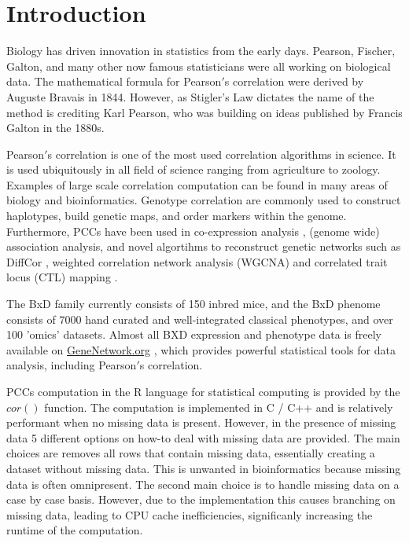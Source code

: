 \documentclass{bioinfo}
\begin{document}
\maketitle

\section{Introduction}
Biology has driven innovation in statistics from the early days. 
Pearson, Fischer, Galton, and many other now famous statisticians 
were all working on biological data. The mathematical formula 
for Pearson$'$s correlation were derived by Auguste Bravais in 1844. 
However, as Stigler's Law \citep{Stigler1980} dictates the name 
of the method is crediting Karl Pearson, who was building on 
ideas published by Francis Galton in the 1880s. 


Pearson$'$s correlation is one of the most used correlation algorithms in science. 
It is used ubiquitously in all field of science ranging from agriculture to 
zoology. Examples of large scale correlation computation can be found in many 
areas of biology and bioinformatics. Genotype correlation are commonly used to 
construct haplotypes, build genetic maps, and order markers within the genome. 
Furthermore, PCCs have been used in co-expression analysis \citep{Tesson:2010}, 
(genome wide) association analysis, and novel algortihms to reconstruct genetic 
networks such as DiffCor \citep{Fukushima:2013}, weighted correlation network 
analysis (WGCNA) \citep{Horvath:2008} and correlated trait locus (CTL) mapping 
\citep{Arends2016a}.

The BxD family currently consists of 150 inbred mice, and the BxD phenome consists 
of 7000 hand curated and well-integrated classical phenotypes, and over 100 'omics' 
datasets. Almost all BXD expression and phenotype data is freely available on 
\href{https://genenetwork.org/}{GeneNetwork.org} \citep{Sloan2016}, which provides 
powerful statistical tools for data analysis, including Pearson$'$s correlation.

PCCs computation in the R language for statistical computing \citep{R:2005} is 
provided by the $cor()$ function. The computation is implemented in C / C++ and 
is relatively performant when no missing data is present. However, 
in the presence of missing data 5 different options on how-to deal 
with missing data are provided. The main choices are removes all rows that 
contain missing data, essentially creating a dataset without missing data. This is 
unwanted in bioinformatics because missing data is often omnipresent. 
The second main choice is to handle missing data on a case by case basis. However, 
due to the implementation this causes branching on missing data, leading to CPU 
cache inefficiencies, significanly increasing the runtime of the computation. 
\end{document}
